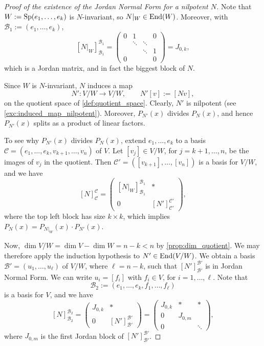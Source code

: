 \begin{proof}[Proof of the existence of the Jordan Normal Form for a nilpotent $N$]
Note that $W := \operatorname{Sp}(e_1, \dots, e_k)$ is $N$-invariant, so $N|_W \in \operatorname{End}(W)$. Moreover, with $\mathcal{B}_1 := (e_1, \dots, e_k)$,
\[
    [N|_W]_{\mathcal{B}_1}^{\mathcal{B}_1} = \begin{pmatrix} 0 & 1 & & 0 \\ & \ddots & \ddots & \\ & & \ddots & 1 \\ 0 & & & 0 \end{pmatrix} = J_{0,k},
\]
which is a Jordan matrix, and in fact the biggest block of $N$.

Since $W$ is $N$-invariant, $N$ induces a map
\[
    N' \colon V/W \to V/W, \qquad N'[v] := [Nv],
\]
on the quotient space of \cref{def:quotient_space}. Clearly, $N'$ is nilpotent (see \cref{exc:induced_map_nilpotent}). Moreover, $P_{N'}(x)$ divides $P_N(x)$, and hence $P_{N'}(x)$ splits as a product of linear factors.

To see why $P_{N'}(x)$ divides $P_N(x)$, extend $e_1, \dots, e_k$ to a basis $\mathcal{C} = (e_1, \dots, e_k, v_{k+1}, \dots, v_n)$ of $V$. Let $[v_j] \in V/W$, for $j = k+1, \dots, n$, be the images of $v_j$ in the quotient. Then $\mathcal{C}' = ([v_{k+1}], \dots, [v_n])$ is a basis for $V/W$, and we have
\[
    [N]_{\mathcal{C}}^{\mathcal{C}} = \left(\begin{array}{c|c} [N|_W]_{\mathcal{B}_1}^{\mathcal{B}_1} & * \\ \hline 0 & [N']_{\mathcal{C}'}^{\mathcal{C}'} \end{array}\right),
\]
where the top left block has size $k \times k$, which implies $P_N(x) = P_{N|_W}(x) \cdot P_{N'}(x)$.

Now, $\dim V/W = \dim V - \dim W = n - k < n$ by \cref{prop:dim_quotient}. We may therefore apply the induction hypothesis to $N' \in \operatorname{End}(V/W)$. We obtain a basis $\mathcal{B}' = (u_1, \dots, u_\ell)$ of $V/W$, where $\ell = n-k$, such that $[N']_{\mathcal{B}'}^{\mathcal{B}'}$ is in Jordan Normal Form. We can write $u_i = [f_i]$ with $f_i \in V$, for $i = 1, \dots, \ell$. Note that
\[
    \mathcal{B}_2 := (e_1, \dots, e_k, f_1, \dots, f_\ell)
\]
is a basis for $V$, and we have
\begin{equation}
\label{eq:N_in_basis_B2}
    [N]_{\mathcal{B}_2}^{\mathcal{B}_2} = \left(\begin{array}{c|c} J_{0,k} & * \\ \hline 0 & [N']_{\mathcal{B}'}^{\mathcal{B}'} \end{array}\right) = \left(\begin{array}{c|cc} J_{0,k} & * & * \\ \hline 0 & J_{0,m} & \\ 0 & & \ddots \end{array}\right),
\end{equation}
where $J_{0,m}$ is the first Jordan block of $[N']_{\mathcal{B}'}^{\mathcal{B}'}$.


\end{proof}
